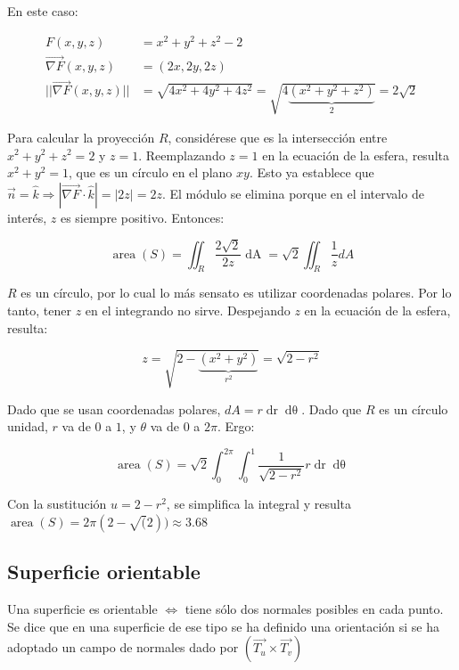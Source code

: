 \documentclass{article}
\begin{document}
En este caso:

\begin{align}
F(x,y,z) &= x^2 + y^2 + z^2 - 2 \\
\overrightarrow{\nabla F}(x,y,z) &= (2x, 2y, 2z) \\
||\overrightarrow{\nabla F}(x,y,z)|| &= \sqrt{4x^2 + 4y^2 + 4z^2} = \sqrt{4 \underbrace{(x^2 + y^2 + z^2)}_{2}} = 2 \sqrt{2}
\end{align}

Para calcular la proyección $R$, considérese que es la intersección entre $x^2 + y^2 + z^2 = 2$ y $z = 1$. Reemplazando $z = 1$ en la ecuación de la esfera, resulta $x^2 + y^2 = 1$, que es un círculo en el plano $xy$. Esto ya establece que $\overrightarrow{n} = \hat{k} \Rightarrow | \overrightarrow{ \nabla F } \cdot \hat{k}| = |2z| = 2z$. El módulo se elimina porque en el intervalo de interés, $z$ es siempre positivo. Entonces:

\begin{equation}
\mathop{area}(S) = \iint_R \frac{2 \sqrt{2}}{2z} \mathop{dA} = \sqrt{2} \iint_R \frac{1}{z} dA 
\end{equation}

$R$ es un círculo, por lo cual lo más sensato es utilizar coordenadas polares. Por lo tanto, tener $z$ en el integrando no sirve. Despejando $z$ en la ecuación de la esfera, resulta:

\begin{equation}
z = \sqrt{2 - \underbrace{ (x^2 + y^2) }_{r^2}} = \sqrt{2 - r^2}
\end{equation}

Dado que se usan coordenadas polares, $dA = r \mathop{dr} \mathop{d\theta}$. Dado que $R$ es un círculo unidad, $r$ va de $0$ a $1$, y $\theta$ va de $0$ a $2\pi$. Ergo:

\begin{equation}
\mathop{area}(S) = \sqrt{2} \int_0^{2\pi} \int_0^1 \frac{1}{\sqrt{2 - r^2}} r \mathop{dr} \mathop{d\theta}
\end{equation}

Con la sustitución $u = 2 - r^2$, se simplifica la integral y resulta $\mathop{area}(S) = 2\pi (2 - \sqrt(2)) \approx 3.68$

\subsection{Superficie orientable}

Una superficie es orientable $\Leftrightarrow$ tiene sólo dos normales posibles en cada punto. Se dice que en una superficie de ese tipo se ha definido una orientación si se ha adoptado un campo de normales dado por $( \overrightarrow{T_u} \times \overrightarrow{T_v} )$
\end{document}

